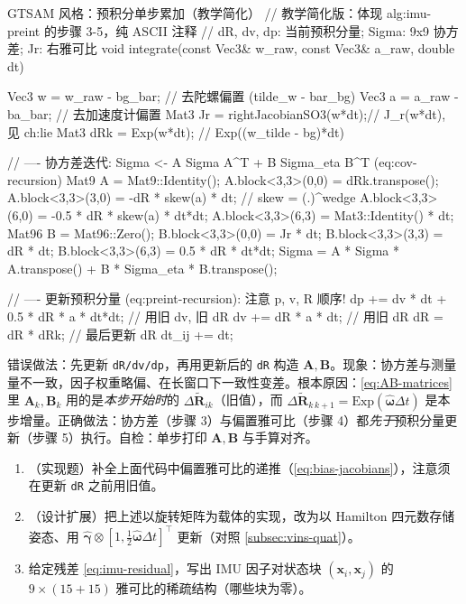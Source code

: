 \begin{codebox}[C++]{GTSAM 风格：预积分单步累加（教学简化）}
// 教学简化版：体现 alg:imu-preint 的步骤 3-5，纯 ASCII 注释
// dR, dv, dp: 当前预积分量; Sigma: 9x9 协方差; Jr: 右雅可比
void integrate(const Vec3& w_raw, const Vec3& a_raw, double dt) {
  Vec3 w = w_raw - bg_bar;          // 去陀螺偏置 (tilde_w - bar_bg)
  Vec3 a = a_raw - ba_bar;          // 去加速度计偏置
  Mat3 Jr  = rightJacobianSO3(w*dt);// J_r(w*dt), 见 ch:lie
  Mat3 dRk = Exp(w*dt);             // Exp((w_tilde - bg)*dt)

  // ---- 协方差迭代: Sigma <- A Sigma A^T + B Sigma_eta B^T (eq:cov-recursion)
  Mat9 A = Mat9::Identity();
  A.block<3,3>(0,0) = dRk.transpose();
  A.block<3,3>(3,0) = -dR * skew(a) * dt;          // skew = (.)^wedge
  A.block<3,3>(6,0) = -0.5 * dR * skew(a) * dt*dt;
  A.block<3,3>(6,3) = Mat3::Identity() * dt;
  Mat96 B = Mat96::Zero();
  B.block<3,3>(0,0) = Jr * dt;
  B.block<3,3>(3,3) = dR * dt;
  B.block<3,3>(6,3) = 0.5 * dR * dt*dt;
  Sigma = A * Sigma * A.transpose() + B * Sigma_eta * B.transpose();

  // ---- 更新预积分量 (eq:preint-recursion): 注意 p, v, R 顺序!
  dp += dv * dt + 0.5 * dR * a * dt*dt;            // 用旧 dv, 旧 dR
  dv += dR * a * dt;                               // 用旧 dR
  dR  = dR * dRk;                                  // 最后更新 dR
  dt_ij += dt;
}
\end{codebox}

\begin{pitfall}
错误做法：先更新 \texttt{dR/dv/dp}，再用更新后的 \texttt{dR} 构造 $\mathbf A,\mathbf B$。现象：协方差与测量量不一致，因子权重略偏、在长窗口下一致性变差。根本原因：\cref{eq:AB-matrices} 里 $\mathbf A_k,\mathbf B_k$ 用的是\emph{本步开始时}的 $\Delta\tilde{\mathbf R}_{ik}$（旧值），而 $\Delta\tilde{\mathbf R}_{k\,k+1}=\mathrm{Exp}(\hat{\boldsymbol\omega}\Delta t)$ 是本步增量。正确做法：协方差（步骤 3）与偏置雅可比（步骤 4）都\emph{先于}预积分量更新（步骤 5）执行。自检：单步打印 $\mathbf A,\mathbf B$ 与手算对齐。
\end{pitfall}

\begin{practice}
\begin{enumerate}
  \item （实现题）补全上面代码中偏置雅可比的递推（\cref{eq:bias-jacobians}），注意须在更新 \texttt{dR} 之前用旧值。
  \item （设计扩展）把上述以旋转矩阵为载体的实现，改为以 Hamilton 四元数存储姿态、用 $\hat{\boldsymbol\gamma}\otimes[1,\tfrac12\hat{\boldsymbol\omega}\Delta t]^\top$ 更新（对照 \cref{subsec:vins-quat}）。
  \item 给定残差 \cref{eq:imu-residual}，写出 IMU 因子对状态块 $(\mathbf x_i,\mathbf x_j)$ 的 $9\times(15{+}15)$ 雅可比的稀疏结构（哪些块为零）。
\end{enumerate}
\end{practice}

